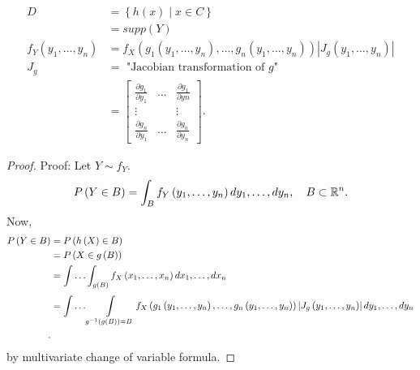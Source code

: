 \begin{theorem}
\begin{align*}
	D &= \left\{ h\left( x \right)  \mid x \in  C \right\} \\
	&= supp\left( Y \right) \\
	f_{Y}\left( y_{1} , \ldots , y_{n} \right) &= f_{X}\left( g_{1}\left( y_{1} , \ldots , y_{n} \right)  , \ldots , g_{n} \left( y_{1} , \ldots , y_{n} \right) \right)  \left| J_{g}\left( y_{1} , \ldots , y_{n} \right) \right| \\
	J_{g} &=  \text{ "Jacobian transformation of $g$"} \\
	&= \begin{bmatrix} 
	\frac{\partial g_1}{\partial y_1} & \ldots & \frac{\partial g_1}{\partial yn} \\
        \vdots & & \vdots \\
\frac{\partial g_{n}}{\partial y_1}  & \ldots & \frac{\partial g_{n}}{\partial y_{n}} \end{bmatrix} 
.\end{align*}
\begin{proof}
	Proof: Let $Y \sim f_{Y}$. 
	\[
		P\left( Y \in  B \right) = \int_{B}^{ } f_{Y} \left( y_{1} , \ldots , y_{n} \right)  dy_{1} , \ldots , dy_{n}, \quad B \subset \mathbb{R}^{n}
	.\] 
	Now, 
	\begin{align*}
		P\left( Y \in  B \right)  &= P\left( h\left( X \right) \in  B \right)  \\
					  &= P \left( X \in  g\left( B \right)  \right)  \\
					  &= \int \ldots \int_{ g\left( B \right) }^{ } f_{X}\left(x_{1} , \ldots , x_{n}\right)    dx_{1} , \ldots , dx_{n} \\
					  &= \int \ldots \int\displaylimits_{ g^{-1}\left(g\left( B \right)\right) = B}^{ } f_{X}\left( g_1 \left( y_{1} , \ldots , y_{n} \right)  , \ldots , g_{n}\left( y_{1} , \ldots , y_{n} \right)  \right)\left| J_{g}\left( y_{1} , \ldots , y_{n} \right) \right| dy_{1} , \ldots , dy_{n}  \\
	.\end{align*}
	by multivariate change of variable formula. 
\end{proof}
	
\end{theorem}

